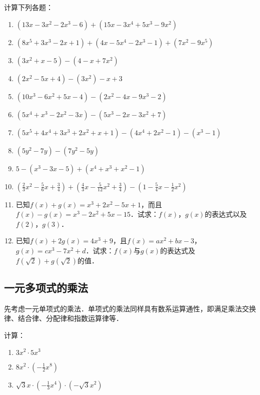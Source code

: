 \begin{ex}
    计算下列各题：
\begin{enumerate}
    \item $(13x-3x^2-2x^3-6)+ (15x-3x^4+5x^3-9x^2)$
    \item $(8x^5+3x^3-2x+1)+(4x-5x^4-2x^3-1)+(7x^2-9x^5)$
    \item $(3x^2+x-5)-(4-x+7x^2)$
    \item $(2x^2-5x+4)-(3x^2)-x+3$
    \item $(10x^3-6x^2+5x-4)-(2x^2-4x-9x^3-2)$
    \item $(5x^4+x^3-2x^2-3x)-(5x^3-2x-3x^2+7)$
    \item $(5x^5+4x^4+3x^3+2x^2+x+1)-(4x^4+2x^2-1)-(x^3-1)$
    \item $(5y^2-7y)-(7y^2-5y)$
    \item $5-(x^3-3x-5)+(x^4+x^3+x^2-1)$
    \item $\left(\frac{2}{3}x^2-\frac{5}{6}x+\frac{3}{4}\right)+\left(\frac{4}{3}x-\frac{5}{12}x^2+\frac{3}{4}\right)-\left(1-\frac{5}{4}x-\frac{1}{2}x^2\right)$
    \item 已知$f(x)+g(x)=x^3+2x^2-5x+1$，而且$f(x)-g(x)=x^3-2x^2+5x-15$．试求：$f(x)$，$g(x)$的表达式以及$f(2)$，$g(3)$．
    \item 已知$f(x)+2g(x)=4x^3+9$，且$f(x)=ax^2+bx-3$，$g(x)=cx^3-7x^2+d$．试求：$f(x)$与$g(x)$的表达式及$f(\sqrt{2})+g(\sqrt{2})$的值．
\end{enumerate}
\end{ex}

\subsection{一元多项式的乘法}

先考虑一元单项式的乘法．单项式的乘法同样具有数系运算通性，即满足乘法交换律、结合律、分配律和指数运算律等．

\begin{example}
    计算：
    \begin{enumerate}
        \item $3x^2\cdot 5x^3$
        \item $8x^2\cdot \left(-\frac{1}{2}x^8\right)$
        \item $\sqrt{3}x\cdot \left(-\frac{1}{3}x^4\right)\cdot \left(-\sqrt{3}x^2\right)$
    \end{enumerate}

\end{example}

